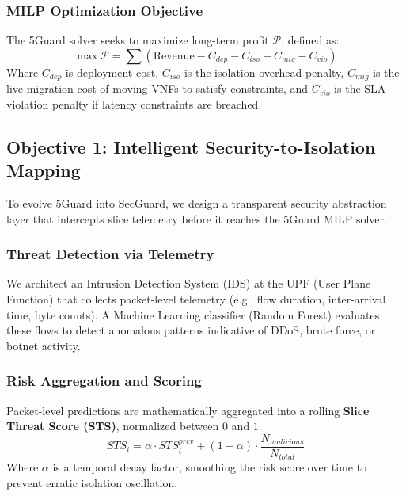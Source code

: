 \documentclass[12pt]{article}
\begin{document}
\subsubsection{MILP Optimization Objective}
The 5Guard solver seeks to maximize long-term profit $\mathcal{P}$, defined as:
\begin{equation}
    \max \mathcal{P} = \sum (\text{Revenue} - C_{dep} - C_{iso} - C_{mig} - C_{vio})
\end{equation}
Where $C_{dep}$ is deployment cost, $C_{iso}$ is the isolation overhead penalty, $C_{mig}$ is the live-migration cost of moving VNFs to satisfy constraints, and $C_{vio}$ is the SLA violation penalty if latency constraints are breached.

\subsection{Objective 1: Intelligent Security-to-Isolation Mapping}
To evolve 5Guard into SecGuard, we design a transparent security abstraction layer that intercepts slice telemetry before it reaches the 5Guard MILP solver.

\subsubsection{Threat Detection via Telemetry}
We architect an Intrusion Detection System (IDS) at the UPF (User Plane Function) that collects packet-level telemetry (e.g., flow duration, inter-arrival time, byte counts). A Machine Learning classifier (Random Forest) evaluates these flows to detect anomalous patterns indicative of DDoS, brute force, or botnet activity.

\subsubsection{Risk Aggregation and Scoring}
Packet-level predictions are mathematically aggregated into a rolling \textbf{Slice Threat Score (STS)}, normalized between $0$ and $1$. 
\begin{equation}
    STS_i = \alpha \cdot STS_{i}^{prev} + (1 - \alpha) \cdot \frac{N_{malicious}}{N_{total}}
\end{equation}
Where $\alpha$ is a temporal decay factor, smoothing the risk score over time to prevent erratic isolation oscillation.
\end{document}
